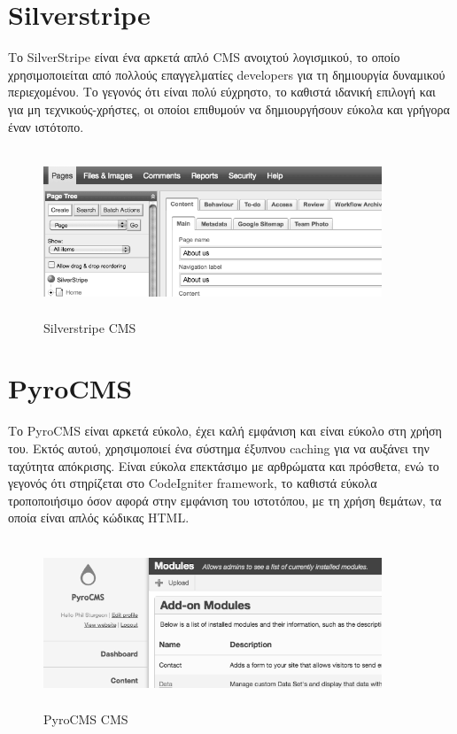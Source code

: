 \documentclass[12pt]{report}
\begin{document}
\section{\textlatin{Silverstripe}}
Το \textlatin{SilverStripe} είναι ένα αρκετά απλό \textlatin{CMS} ανοιχτού λογισμικού, το οποίο χρησιμοποιείται από πολλούς επαγγελματίες \textlatin{developers} για τη δημιουργία δυναμικού περιεχομένου. Το γεγονός ότι είναι πολύ εύχρηστο, το καθιστά ιδανική επιλογή και για μη τεχνικούς-χρήστες, οι οποίοι επιθυμούν να δημιουργήσουν εύκολα και γρήγορα έναν ιστότοπο.
\begin{figure}[H]
\centering
\includegraphics[width=0.9\textwidth, height=5cm]{silverstripe-gray}
\caption{\textlatin{Silverstripe CMS}}
\label{fig:silverstripe}
\end{figure}

\section{\textlatin{PyroCMS}}
Το \textlatin{PyroCMS} είναι αρκετά εύκολο, έχει καλή εμφάνιση και είναι εύκολο στη χρήση του. Εκτός αυτού, χρησιμοποιεί ένα σύστημα έξυπνου \textlatin{caching} για να αυξάνει την ταχύτητα απόκρισης. Είναι εύκολα επεκτάσιμο με αρθρώματα και πρόσθετα, ενώ το γεγονός ότι στηρίζεται στο \textlatin{CodeIgniter framework}, το καθιστά εύκολα τροποποιήσιμο όσον αφορά στην εμφάνιση του ιστοτόπου, με τη χρήση θεμάτων, τα οποία είναι απλός κώδικας \textlatin{HTML}.
\begin{figure}[H]
\centering
\includegraphics[width=0.9\textwidth, height=5cm]{pyrocms-gray}
\caption{\textlatin{PyroCMS CMS}}
\label{fig:pyrocms}
\end{figure}
\end{document}
